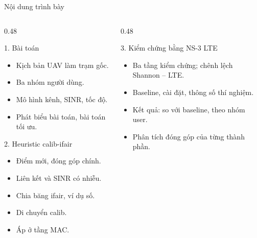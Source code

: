 \documentclass[aspectratio=169,10pt,t]{beamer}
\begin{document}
\begin{frame}{Nội dung trình bày}
\begin{columns}[T,onlytextwidth]
\begin{column}{0.48\textwidth}
\vspace{0pt}
  \begin{minipage}[t][3.25cm][t]{\linewidth}
  \begin{block}{1. Bài toán}
    \begin{itemize}
      \item Kịch bản UAV làm trạm gốc.
      \item Ba nhóm người dùng.
      \item Mô hình kênh, SINR, tốc độ.
      \item Phát biểu bài toán, bài toán tối ưu.
    \end{itemize}
  \end{block}
  \end{minipage}

  \begin{block}{2. Heuristic calib-ifair}
    \begin{itemize}
      \item Điểm mới, đóng góp chính.
      \item Liên kết và SINR có nhiễu.
      \item Chia băng ifair, ví dụ số.
      \item Di chuyển calib.
      \item Áp ở tầng MAC.
    \end{itemize}
  \end{block}
\end{column}
\begin{column}{0.48\textwidth}
\vspace{0pt}
  \begin{minipage}[t][3.25cm][t]{\linewidth}
  \begin{block}{3. Kiểm chứng bằng NS-3 LTE}
    \begin{itemize}
      \item Ba tầng kiểm chứng; chênh lệch Shannon -- LTE.
      \item Baseline, cài đặt, thông số thí nghiệm.
      \item Kết quả: so với baseline, theo nhóm user.
      \item Phân tích đóng góp của từng thành phần.
    \end{itemize}
  \end{block}
  \end{minipage}


\end{column}
\end{columns}
\end{frame}
\end{document}
